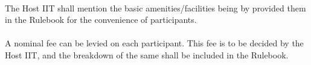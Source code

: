 \paragraph{}
The Host IIT shall mention the basic amenities/facilities being by provided them in the Rulebook for the convenience of participants.

\paragraph{}
A nominal fee can be levied on each participant. This fee is to be decided by the Host IIT, and the breakdown of the same shall be included in the Rulebook.